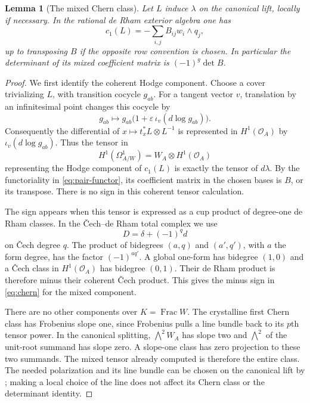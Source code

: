 \documentclass[11pt]{article}
\newtheorem{lemma}[theorem]{Lemma}
\theoremstyle{definition}\newtheorem{definition}[theorem]{Definition}
\theoremstyle{remark}\newtheorem{remark}[theorem]{Remark}
\newcommand{\OO}{\mathcal O}
\begin{document}
\begin{lemma}[The mixed Chern class]\label{lem:chern}
Let $L$ induce $\lambda$ on the canonical lift, locally if necessary. In the rational de Rham exterior algebra one has
\begin{equation}\label{eq:chern}
 c_1(L)=-\sum_{i,j}B_{ij}w_i\wedge q_j,
\end{equation}
up to transposing $B$ if the opposite row convention is chosen. In particular the determinant of its mixed coefficient matrix is $(-1)^g\det B$.
\end{lemma}
\begin{proof}
We first identify the coherent Hodge component. Choose a cover trivializing $L$, with transition cocycle $g_{ab}$. For a tangent vector $v$, translation by an infinitesimal point changes this cocycle by
\[
 g_{ab}\longmapsto g_{ab}\bigl(1+\varepsilon\,\iota_v(d\log g_{ab})\bigr).
\]
Consequently the differential of $x\mapsto t_x^*L\otimes L^{-1}$ is represented in $H^1(\OO_A)$ by $\iota_v(d\log g_{ab})$. Thus the tensor in
\[
 H^1(\Omega^1_{A/W})=W_A\otimes H^1(\OO_A)
\]
representing the Hodge component of $c_1(L)$ is exactly the tensor of $d\lambda$. By the functoriality in \eqref{eq:pair-functor}, its coefficient matrix in the chosen bases is $B$, or its transpose. There is no sign in this coherent tensor calculation.

The sign appears when this tensor is expressed as a cup product of degree-one de Rham classes. In the \v Cech--de Rham total complex we use
\[
 D=\delta+(-1)^q d
\]
on \v Cech degree $q$. The product of bidegrees $(a,q)$ and $(a',q')$, with $a$ the form degree, has the factor $(-1)^{a q'}$. A global one-form has bidegree $(1,0)$ and a \v Cech class in $H^1(\OO_A)$ has bidegree $(0,1)$. Their de Rham product is therefore minus their coherent \v Cech product. This gives the minus sign in \eqref{eq:chern} for the mixed component.

There are no other components over $K=\operatorname{Frac}W$. The crystalline first Chern class has Frobenius slope one, since Frobenius pulls a line bundle back to its $p$th tensor power. In the canonical splitting, $\bigwedge^2W_A$ has slope two and $\bigwedge^2$ of the unit-root summand has slope zero. A slope-one class has zero projection to these two summands. The mixed tensor already computed is therefore the entire class. The needed polarization and its line bundle can be chosen on the canonical lift by \citet[Theorem~1.4 and following paragraph, p.~115]{DworkOgus}; making a local choice of the line does not affect its Chern class or the determinant identity.
\end{proof}
\end{document}
